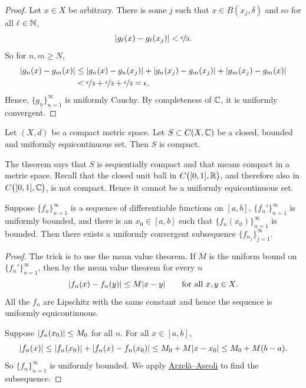 \begin{proof}
Let $x \in X$ be arbitrary.  There is some $j$ such that
$x \in B(x_j,\delta)$ and so for all $\ell \in {\mathbb{N}}$,
\begin{equation*}
\lvert {g_\ell(x)-g_\ell(x_j)} \rvert < \nicefrac{\epsilon}{3}.
\end{equation*}
So for $n,m \geq N$,
\begin{equation*}
\begin{split}
\lvert {g_n(x)-g_m(x)} \rvert & \leq
\lvert {g_n(x)-g_n(x_j)} \rvert +
\lvert {g_n(x_j)-g_m(x_j)} \rvert +
\lvert {g_m(x_j)-g_m(x)} \rvert
\\
& <
\nicefrac{\epsilon}{3} +
\nicefrac{\epsilon}{3} +
\nicefrac{\epsilon}{3} = \epsilon .
\end{split}
\end{equation*}
Hence, $\{ g_n \}_{n=1}^\infty$ is uniformly Cauchy.  By completeness of ${\mathbb{C}}$,
it is uniformly convergent.
\end{proof}

\begin{cor}
Let $(X,d)$ be a compact metric space.
Let $S \subset C(X,{\mathbb{C}})$ be a closed, bounded and uniformly equicontinuous set.
Then $S$ is compact.
\end{cor}

The theorem says that $S$
is sequentially compact and that means
compact in a metric space.
Recall that the closed unit ball in $C\bigl([0,1],{\mathbb{R}}\bigr)$, and therefore also in
$C\bigl([0,1],{\mathbb{C}}\bigr)$, is not compact.
Hence it cannot be a uniformly equicontinuous set.

\begin{cor}
Suppose $\{ f_n \}_{n=1}^\infty$ is a sequence of differentiable functions on $[a,b]$,
$\{ f_n' \}_{n=1}^\infty$ is uniformly bounded, and there is an
$x_0 \in [a,b]$ such that $\{ f_n(x_0) \}_{n=1}^\infty$ is bounded.
Then there exists a uniformly convergent
subsequence $\{ f_{n_j} \}_{j=1}^\infty$.
\end{cor}

\begin{proof}
The trick is to use the mean value theorem.  If $M$ is the uniform bound on
$\{ f_n' \}_{n=1}^\infty$, then by the mean value theorem for every $n$
\begin{equation*}
\lvert {f_n(x)-f_n(y)} \rvert \leq M \lvert {x-y} \rvert \qquad \text{for all } x,y \in X.
\end{equation*}
All the $f_n$ are Lipschitz with the same constant and hence
the sequence is
uniformly equicontinuous.

Suppose $\lvert {f_n(x_0)} \rvert \leq M_0$ for all $n$.
For all $x \in [a,b]$,
\begin{equation*}
\lvert {f_n(x)} \rvert \leq \lvert {f_n(x_0)} \rvert+ \lvert {f_n(x)-f_n(x_0)} \rvert \leq M_0+ M \lvert {x-x_0} \rvert
\leq M_0 + M(b-a) .
\end{equation*}
So $\{ f_n \}_{n=1}^\infty$ is uniformly bounded.
We apply \hyperref[thm:arzelaascoli]{Arzel\`a--Ascoli} to find the subsequence.
\end{proof}

